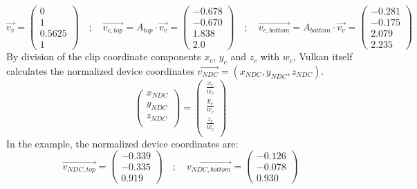 \begin{equation*}
    \vec{v_{v}} =     
    \begin{pmatrix}
        0 \\
        1 \\
        0.5625 \\
        1
    \end{pmatrix} \quad ; \quad
    \vec{v_{c, top}} = A_{top} \cdot  \vec{v_{v}} =     
    \begin{pmatrix}
        -0.678 \\
        -0.670 \\
        1.838 \\
        2.0
    \end{pmatrix}
    \quad ; \quad
    \vec{v_{c, bottom}} = A_{bottom} \cdot  \vec{v_{v}} =     
    \begin{pmatrix}
        -0.281 \\
        -0.175 \\
        2.079 \\
        2.235
    \end{pmatrix}
\end{equation*}
By division of the clip coordinate components $x_{c}$, $y_{c}$ and $z_{c}$ with $w_{c}$, Vulkan itself calculates the normalized device coordinates $\vec{v_{NDC}} = (x_{NDC}, y_{NDC}, z_{NDC})$.
\begin{equation*}
    \begin{pmatrix}
        x_{NDC} \\
        y_{NDC} \\
        z_{NDC} \\
    \end{pmatrix}
    =
    \begin{pmatrix}
        \frac{x_{c}}{w_{c}} \\
        \frac{y_{c}}{w_{c}} \\
        \frac{z_{c}}{w_{c}} \\
    \end{pmatrix}
\end{equation*}
In the example, the normalized device coordinates are: 
\begin{equation*}
    \vec{v_{NDC,top}} =     
    \begin{pmatrix}
        -0.339 \\
        -0.335 \\
        0.919
    \end{pmatrix} \quad ; \quad
    \vec{v_{NDC,bottom}} = 
    \begin{pmatrix}
        -0.126 \\
        -0.078 \\
        0.930
    \end{pmatrix}
\end{equation*}
